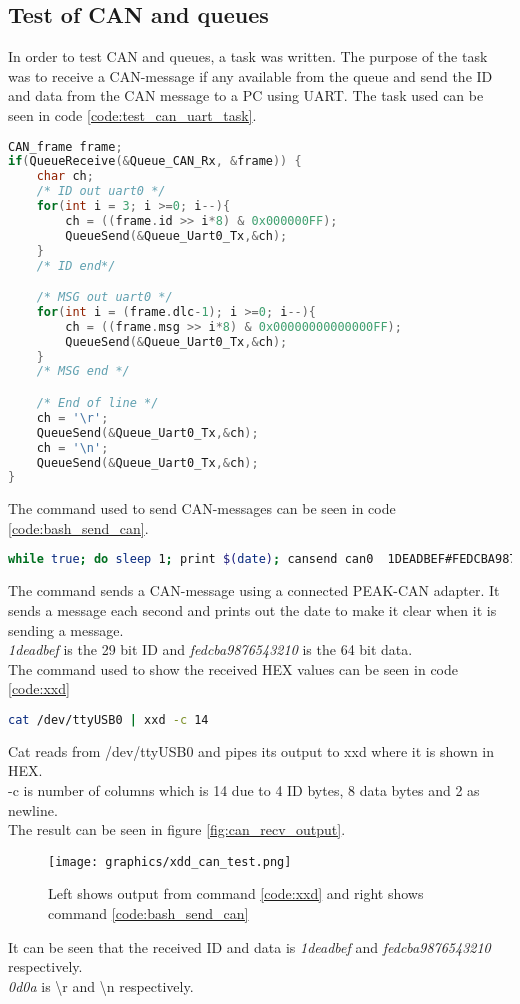 \subsection*{Test of CAN and queues} \label{sec:test_of_queues}
In order to test CAN and queues, a task was written. The purpose of the task was to receive a CAN-message if any available from the queue and send the ID and data from the CAN message to a PC using UART.
The task used can be seen in code \ref{code:test_can_uart_task}.


\begin{lstlisting}[language = c, caption = Snippet of task used to test CAN, label=code:test_can_uart_task]
CAN_frame frame;
if(QueueReceive(&Queue_CAN_Rx, &frame)) {
	char ch;
	/* ID out uart0 */
	for(int i = 3; i >=0; i--){
		ch = ((frame.id >> i*8) & 0x000000FF);
		QueueSend(&Queue_Uart0_Tx,&ch);
	}
	/* ID end*/

	/* MSG out uart0 */
	for(int i = (frame.dlc-1); i >=0; i--){
		ch = ((frame.msg >> i*8) & 0x00000000000000FF);
		QueueSend(&Queue_Uart0_Tx,&ch);
	}
	/* MSG end */

	/* End of line */
	ch = '\r';
	QueueSend(&Queue_Uart0_Tx,&ch);
	ch = '\n';
	QueueSend(&Queue_Uart0_Tx,&ch);
}
\end{lstlisting}
The command used to send CAN-messages can be seen in code \ref{code:bash_send_can}.

\begin{lstlisting}[language = bash, caption = Task used to test CAN, label=code:bash_send_can]
while true; do sleep 1; print $(date); cansend can0  1DEADBEF#FEDCBA9876543210; done
\end{lstlisting}
The command sends a CAN-message using a connected PEAK-CAN adapter. It sends a message each second and prints out the date to make it clear when it is sending a message.\\ \textit{1deadbef} is the 29 bit ID and \textit{fedcba9876543210} is the 64 bit data. \\


The command used to show the received HEX values can be seen in code \ref{code:xxd}

\begin{lstlisting}[language = bash, caption = Command used to get UART messages, label=code:xxd]
cat /dev/ttyUSB0 | xxd -c 14 
\end{lstlisting}
Cat reads from /dev/ttyUSB0 and pipes its output to xxd where it is shown in HEX.\\ -c is number of columns which is 14 due to 4 ID bytes, 8 data bytes and 2 as newline.\\

The result can be seen in figure \ref{fig:can_recv_output}.
\begin{figure}[H]
    \center
    \texttt{[image: graphics/xdd\_can\_test.png]}
  \label{fig:boat1}
  \caption{Left shows output from command \ref{code:xxd} and right shows command \ref{code:bash_send_can}}
\end{figure}
It can be seen that the received ID and data is \textit{1deadbef} and \textit{fedcba9876543210} respectively.\\
\textit{0d0a} is \textbackslash r and \textbackslash n respectively.


